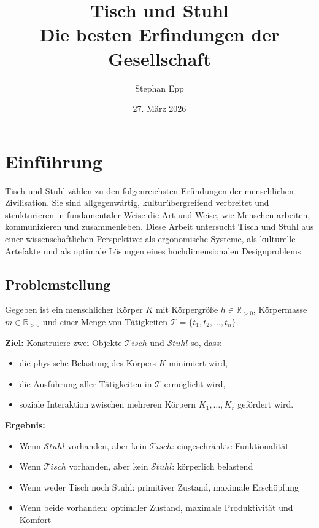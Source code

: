 ﻿\documentclass[a4paper,12pt]{article}
\title{\textbf{Tisch und Stuhl}\\Die besten Erfindungen der Gesellschaft}
\author{Stephan Epp}
\date{27. M\"{a}rz 2026}
\theoremstyle{definition}
\begin{document}
\maketitle

\tableofcontents
\newpage

\section{Einf\"{u}hrung}

Tisch und Stuhl z\"{a}hlen zu den folgenreichsten Erfindungen der menschlichen Zivilisation.
Sie sind allgegenw\"{a}rtig, kultur\"{u}bergreifend verbreitet und strukturieren in fundamentaler
Weise die Art und Weise, wie Menschen arbeiten, kommunizieren und zusammenleben.
Diese Arbeit untersucht Tisch und Stuhl aus einer wissenschaftlichen Perspektive: als
ergonomische Systeme, als kulturelle Artefakte und als optimale L\"{o}sungen eines
hochdimensionalen Designproblems.

\subsection{Problemstellung}

Gegeben ist ein menschlicher K\"{o}rper $K$ mit K\"{o}rpergr\"{o}\ss{}e $h \in \mathbb{R}_{>0}$,
K\"{o}rpermasse $m \in \mathbb{R}_{>0}$ und einer Menge von T\"{a}tigkeiten
$\mathcal{T} = \{t_1, t_2, \ldots, t_n\}$.

\textbf{Ziel:} Konstruiere zwei Objekte $\mathcal{T}\!isch$ und $\mathcal{S}tuhl$ so, dass:
\begin{itemize}
	\item die physische Belastung des K\"{o}rpers $K$ minimiert wird,
	\item die Ausf\"{u}hrung aller T\"{a}tigkeiten in $\mathcal{T}$ erm\"{o}glicht wird,
	\item soziale Interaktion zwischen mehreren K\"{o}rpern $K_1, \ldots, K_r$ gef\"{o}rdert wird.
\end{itemize}

\textbf{Ergebnis:}
\begin{itemize}
	\item Wenn $\mathcal{S}tuhl$ vorhanden, aber kein $\mathcal{T}\!isch$: eingeschr\"{a}nkte Funktionalit\"{a}t
	\item Wenn $\mathcal{T}\!isch$ vorhanden, aber kein $\mathcal{S}tuhl$: k\"{o}rperlich belastend
	\item Wenn weder Tisch noch Stuhl: primitiver Zustand, maximale Ersch\"{o}pfung
	\item Wenn beide vorhanden: optimaler Zustand, maximale Produktivit\"{a}t und Komfort
\end{itemize}
\end{document}

